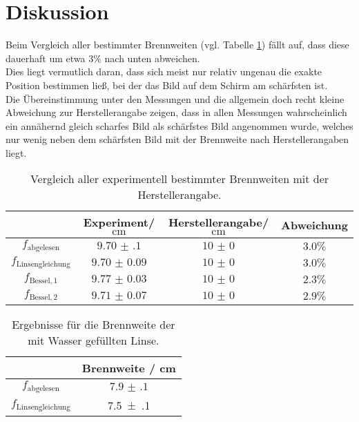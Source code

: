 \FloatBarrier
\section{Diskussion}
\label{sec:Diskussion}
Beim Vergleich aller bestimmter Brennweiten (vgl. Tabelle \ref{tab:diskus}) fällt auf, dass diese dauerhaft um etwa $3\%$ nach unten abweichen.
\\Dies liegt vermutlich daran, dass sich meist nur relativ ungenau die exakte Position bestimmen ließ, bei der das Bild auf dem Schirm am schärfsten ist.
\\Die Übereinstimmung unter den Messungen und die allgemein doch recht kleine Abweichung zur Herstellerangabe zeigen, dass in allen Messungen wahrscheinlich ein annähernd gleich scharfes Bild als schärfstes Bild angenommen wurde, welches nur wenig neben dem schärfsten Bild mit der Brennweite nach Herstellerangaben liegt.

\begin{table}
  \centering
  \caption{Vergleich aller experimentell bestimmter Brennweiten mit der Herstellerangabe.}
  \label{tab:diskus}
  \begin{tabular}{cccc}
    \toprule
    &Experiment/$\si{\centi\meter}$&Herstellerangabe/$\si{\centi\meter}$&Abweichung\\
    \midrule
    $f_{\mathrm{abgelesen}}$&$\num{9.70(10)}$&$\num{10(0)}$&$3.0\%$\\
    $f_{\mathrm{Linsengleichung}}$&$\num{9.70(9)}$&$\num{10(0)}$&$3.0\%$\\
    $f_\mathrm{Bessel, 1}$&$\num{9.77(3)}$&$\num{10(0)}$&$2.3\%$\\
    $f_\mathrm{Bessel, 2}$&$\num{9.71(7)}$&$\num{10(0)}$&$2.9\%$\\
\bottomrule
\end{tabular}
\end{table}

\begin{table}
  \centering
  \caption{Ergebnisse für die Brennweite der mit Wasser gefüllten Linse.}
  \label{tab:diskussssss}
  \begin{tabular}{cc}
    \toprule
	  & Brennweite / \si{\centi\meter} \\
    \midrule
    $f_{\mathrm{abgelesen}}$&$\num{7.9(1)}$ \\
	  $f_{\mathrm{Linsengleichung}}$ & \num{7.5(1)} \\
\bottomrule
\end{tabular}
\end{table}


